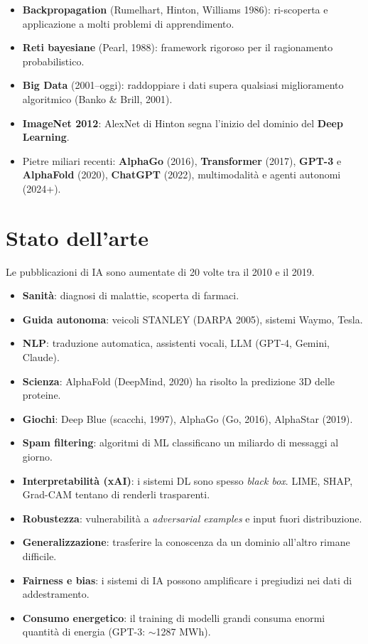 \begin{itemize}
    \item \textbf{Backpropagation} (Rumelhart, Hinton, Williams 1986): ri-scoperta e applicazione a molti problemi di apprendimento.
    \item \textbf{Reti bayesiane} (Pearl, 1988): framework rigoroso per il ragionamento probabilistico.
    \item \textbf{Big Data} (2001--oggi): raddoppiare i dati supera qualsiasi miglioramento algoritmico (Banko \& Brill, 2001).
    \item \textbf{ImageNet 2012}: AlexNet di Hinton segna l'inizio del dominio del \textbf{Deep Learning}.
    \item Pietre miliari recenti: \textbf{AlphaGo} (2016), \textbf{Transformer} (2017), \textbf{GPT-3} e \textbf{AlphaFold} (2020), \textbf{ChatGPT} (2022), multimodalit\`a e agenti autonomi (2024+).
\end{itemize}


\section{Stato dell'arte}


Le pubblicazioni di IA sono aumentate di 20 volte tra il 2010 e il 2019.

\begin{exbox}
\begin{itemize}
    \item \textbf{Sanit\`a}: diagnosi di malattie, scoperta di farmaci.
    \item \textbf{Guida autonoma}: veicoli STANLEY (DARPA 2005), sistemi Waymo, Tesla.
    \item \textbf{NLP}: traduzione automatica, assistenti vocali, LLM (GPT-4, Gemini, Claude).
    \item \textbf{Scienza}: AlphaFold (DeepMind, 2020) ha risolto la predizione 3D delle proteine.
    \item \textbf{Giochi}: Deep Blue (scacchi, 1997), AlphaGo (Go, 2016), AlphaStar (2019).
    \item \textbf{Spam filtering}: algoritmi di ML classificano un miliardo di messaggi al giorno.
\end{itemize}
\end{exbox}

\begin{itemize}
    \item \textbf{Interpretabilit\`a (xAI)}: i sistemi DL sono spesso \emph{black box}. LIME, SHAP, Grad-CAM tentano di renderli trasparenti.
    \item \textbf{Robustezza}: vulnerabilit\`a a \emph{adversarial examples} e input fuori distribuzione.
    \item \textbf{Generalizzazione}: trasferire la conoscenza da un dominio all'altro rimane difficile.
    \item \textbf{Fairness e bias}: i sistemi di IA possono amplificare i pregiudizi nei dati di addestramento.
    \item \textbf{Consumo energetico}: il training di modelli grandi consuma enormi quantit\`a di energia (GPT-3: $\sim$1287 MWh).
\end{itemize}



